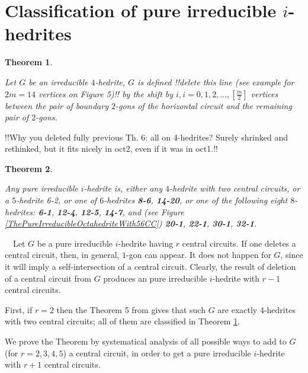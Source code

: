 \documentclass[12pt]{article}
\newtheorem{theor}{Theorem}
\newcommand{\proof}{\noindent{\bf Proof.}\ \ }
\begin{document}
\section{Classification of pure irreducible $i$-hedrites}

\begin{theor}\label{Theorem-for-4-hedrite}

Let $G$ be an irreducible $4$-hedrite, $G$ is defined 
!!delete this line (see example for $2m=14$ vertices on Figure 5)!! 
by the shift by $i, i=0,1,2,..., [\frac{m}{2}]$ 
vertices between the pair of boundary $2$-gons of the horizontal circuit and the remaining pair of $2$-gons.

\end{theor}


!!Why you deleted fully previous Th. 6: all on 4-hedrites?
Surely shrinked and rethinked, but it fits nicely in oct2, even if
it was in oct1.!!







\begin{theor}\label{TheOneWithSimpleCentralCircuit}

Any pure irreducible $i$-hedrite is, either any $4$-hedrite with two
central circuits, or a $5$-hedrite 6-2, or one of $6$-hedrites {\bf 8-6}, 
{\bf 14-20}, or one of the following eight $8$-hedrites: {\bf 6-1},
{\bf 12-4}, 
{\bf 12-5}, {\bf 14-7}, and (see Figure 
\ref{ThePureIrreducibleOctahedriteWith56CC})
{\bf 20-1}, {\bf 22-1}, {\bf 30-1}, {\bf 32-1}.


\end{theor}


\proof Let $G$ be a pure irreducible $i$-hedrite having $r$ central circuits. 
If one deletes a central circuit, then, in general, $1$-gon can appear. It 
does not happen for $G$, since it will imply a self-intersection of a central 
circuit. Clearly, the result of deletion of a central circuit from $G$ 
produces an pure irreducible $i$-hedrite with $r-1$ central circuits.

First, if $r=2$ then the Theorem 5 from \cite{DSt} gives that such $G$ are 
exactly $4$-hedrites with two central circuits; all of them are classified 
in Theorem \ref{Theorem-for-4-hedrite}.

We prove the Theorem by systematical analysis of all possible ways to add 
to $G$ (for $r=2,3,4,5$) a central circuit, in order to get a pure 
irreducible $i$-hedrite with $r+1$ central circuits. 
\end{document}
